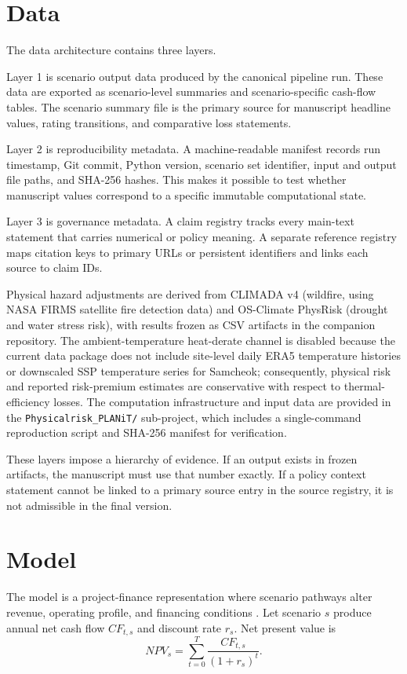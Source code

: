 \documentclass[preprint,12pt]{elsarticle}
\begin{document}
\section{Data}
The data architecture contains three layers.

Layer 1 is scenario output data produced by the canonical pipeline run. These data are exported as scenario-level summaries and scenario-specific cash-flow tables. The scenario summary file is the primary source for manuscript headline values, rating transitions, and comparative loss statements.

Layer 2 is reproducibility metadata. A machine-readable manifest records run timestamp, Git commit, Python version, scenario set identifier, input and output file paths, and SHA-256 hashes. This makes it possible to test whether manuscript values correspond to a specific immutable computational state.

Layer 3 is governance metadata. A claim registry tracks every main-text statement that carries numerical or policy meaning. A separate reference registry maps citation keys to primary URLs or persistent identifiers and links each source to claim IDs.

Physical hazard adjustments are derived from CLIMADA v4 (wildfire, using NASA FIRMS satellite fire detection data) and OS-Climate PhysRisk (drought and water stress risk), with results frozen as CSV artifacts in the companion repository. The ambient-temperature heat-derate channel is disabled because the current data package does not include site-level daily ERA5 temperature histories or downscaled SSP temperature series for Samcheok; consequently, physical risk and reported risk-premium estimates are conservative with respect to thermal-efficiency losses. The computation infrastructure and input data are provided in the \texttt{Physicalrisk\_PLANiT/} sub-project, which includes a single-command reproduction script and SHA-256 manifest for verification.

These layers impose a hierarchy of evidence. If an output exists in frozen artifacts, the manuscript must use that number exactly. If a policy context statement cannot be linked to a primary source entry in the source registry, it is not admissible in the final version.

\section{Model}
The model is a project-finance representation where scenario pathways alter revenue, operating profile, and financing conditions \citep{yescombe2014principles,esty2004large}. Let scenario $s$ produce annual net cash flow $CF_{t,s}$ and discount rate $r_s$. Net present value is
\begin{equation}
NPV_s = \sum_{t=0}^{T} \frac{CF_{t,s}}{(1+r_s)^t}.
\end{equation}
\end{document}
